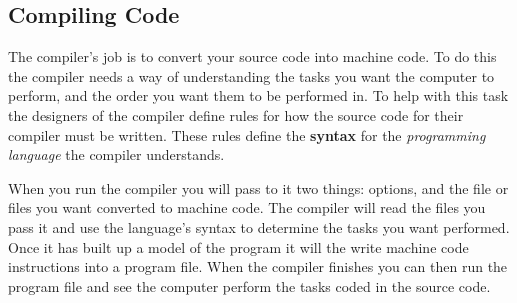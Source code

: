 



% 






\clearpage
\subsection{Compiling Code} %
\label{sub:compiling_code}

The compiler's job is to convert your source code into machine code. To do this the compiler needs a way of understanding the tasks you want the computer to perform, and the order you want them to be performed in. To help with this task the designers of the compiler define rules for how the source code for their compiler must be written. These rules define the \textbf{syntax} for the \emph{programming language} the compiler understands.

When you run the compiler you will pass to it two things: options, and the file or files you want converted to machine code. The compiler will read the files you pass it and use the language's syntax to determine the tasks you want performed. Once it has built up a model of the program it will the write machine code instructions into a program file. When the compiler finishes you can then run the program file and see the computer perform the tasks coded in the source code.

\begin{multicols}{2}
  \columnbreak
\end{multicols}


